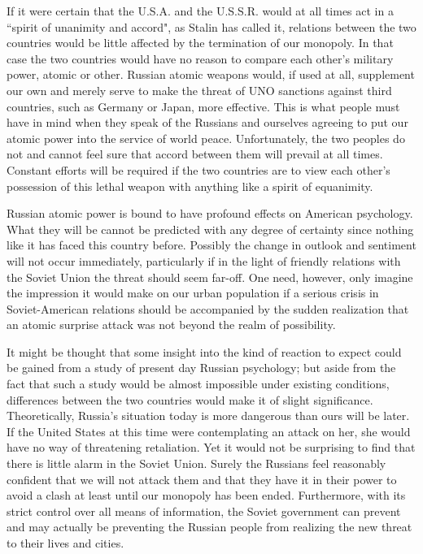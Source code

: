 If it were certain that the U.S.A. and the U.S.S.R. would at all times act in a ``spirit of unanimity and accord", as Stalin has called it, relations between the two countries would be little affected by the termination of our monopoly. In that case the two countries would have no reason to compare each other's military power, atomic or other. Russian atomic weapons would, if used at all, supplement our own and merely serve to make the threat of UNO sanctions against third countries, such as Germany or Japan, more effective. This is what people must have in mind when they speak of the Russians and ourselves agreeing to put our atomic power into the service of world peace. Unfortunately, the two peoples do not and cannot feel sure that accord between them will prevail at all times. Constant efforts will be required if the two countries are to view each other's possession of this lethal weapon with anything like a spirit of equanimity.

Russian atomic power is bound to have profound effects on American psychology. What they will be cannot be predicted with any degree of certainty since nothing like it has faced this country before. Possibly the change in outlook and sentiment will not occur immediately, particularly if in the light of friendly relations with the Soviet Union the threat should seem far-off. One need, however, only imagine the impression it would make on our urban population if a serious crisis in Soviet-American relations should be accompanied by the sudden realization that an atomic surprise attack was not beyond the realm of possibility.

It might be thought that some insight into the kind of reaction to expect could be gained from a study of present day Russian psychology; but aside from the fact that such a study would be almost impossible under existing conditions, differences between the two countries would make it of slight significance. Theoretically, Russia's situation today is more dangerous than ours will be later. If the United States at this time were contemplating an attack on her, she would have no way of threatening retaliation. Yet it would not be surprising to find that there is little alarm in the Soviet Union. Surely the Russians feel reasonably confident that we will not attack them and that they have it in their power to avoid a clash at least until our monopoly has been ended. Furthermore, with its strict control over all means of information, the Soviet government can prevent and may actually be preventing the Russian people from realizing the new threat to their lives and cities.

